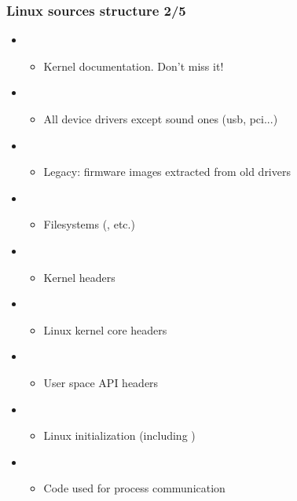 \begin{frame}
  \frametitle{Linux sources structure 2/5}
  \begin{itemize}  
  \item {}
    \begin{itemize}
    \item Kernel documentation. Don't miss it!
    \end{itemize}
  \item {}
    \begin{itemize}
    \item All device drivers except sound ones (usb, pci...)
    \end{itemize}
  \item {}
    \begin{itemize}
    \item Legacy: firmware images extracted from old drivers 
    \end{itemize}
  \item {}
    \begin{itemize}
    \item Filesystems (, etc.)
    \end{itemize}
  \item {}
    \begin{itemize}
    \item Kernel headers
    \end{itemize}
  \item {}
    \begin{itemize}
    \item Linux kernel core headers
    \end{itemize}
  \item {}
    \begin{itemize}
    \item User space API headers
    \end{itemize}
  \item {}
    \begin{itemize}
    \item Linux initialization (including )
    \end{itemize}
  \item {}
    \begin{itemize}
    \item Code used for process communication
    \end{itemize}
  \end{itemize}
\end{frame}


